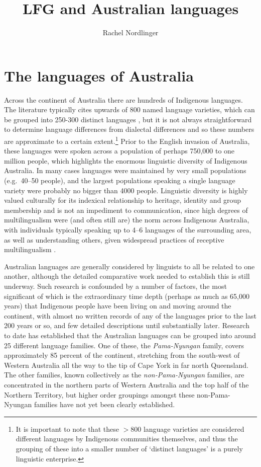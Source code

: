 \documentclass[output=paper,hidelinks]{langscibook}
\title{LFG and Australian languages}
\author{Rachel Nordlinger\affiliation{University of Melbourne}}
\begin{document}
\maketitle
\label{chap:Australian}

\section{The languages of Australia}
\label{sec:ozlges}
Across the continent of Australia there are hundreds of Indigenous languages. The literature typically cites upwards of 800 named language varieties, which can be grouped into 250-300 distinct languages \citep{KochNord2014}, but it is not always straightforward to determine language differences from dialectal differences and so these numbers are approximate to a certain extent.\footnote{It is important to note that these $>$800 language varieties are considered different languages by Indigenous communities themselves, and thus the grouping of these into a smaller number of `distinct languages' is a purely linguistic enterprise.}  Prior to the English invasion of Australia, these languages were spoken across a population of perhaps 750,000 to one million people, which highlights the enormous linguistic diversity of Indigenous Australia. In many cases languages were maintained by very small populations (e.g.\ 40–50 people), and the largest populations speaking a single language variety were probably no bigger than 4000 people. Linguistic diversity is highly valued culturally for its indexical relationship to heritage, identity and group membership \citep{Evans2007} and is not an impediment to communication, since high degrees of multilingualism were (and often still are) the norm across Indigenous Australia, with individuals typically speaking up to 4–6 languages of the surrounding area, as well as understanding others, given widespread practices of receptive multilingualism \citep{Singer2018}. 

Australian languages are generally considered by linguists to all be related to one another, although the detailed comparative work needed to establish this is still underway. Such research is confounded by a number of factors, the most significant of which is the extraordinary time depth (perhaps as much as 65,000 years) that Indigenous people have been living on and moving around the continent, with almost no written records of any of the languages prior to the last 200 years or so, and few detailed descriptions until substantially later. Research to date has established that the Australian languages can be grouped into around 25 different language families. One of these, the {\it Pama-Nyungan} family, covers approximately 85 percent of the continent, stretching from the south-west of Western Australia all the way to the tip of Cape York in far north Queensland. The other families, known collectively as the {\it non-Pama-Nyungan} families, are concentrated in the northern parts of Western Australia and the top half of the Northern Territory, but higher order groupings amongst these non-Pama-Nyungan families have not yet been clearly established.
\end{document}
